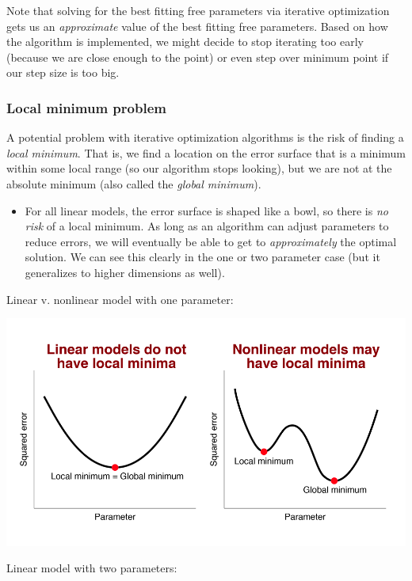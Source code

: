 \documentclass[
  letterpaper,
  DIV=11,
  numbers=noendperiod]{scrartcl}
\providecommand{\tightlist}{%
  \setlength{\itemsep}{0pt}\setlength{\parskip}{0pt}}\usepackage{longtable,booktabs,array}
\begin{document}
Note that solving for the best fitting free parameters via iterative
optimization gets us an \emph{approximate} value of the best fitting
free parameters. Based on how the algorithm is implemented, we might
decide to stop iterating too early (because we are close enough to the
point) or even step over minimum point if our step size is too big.

\subsubsection{Local minimum problem}\label{local-minimum-problem}

A potential problem with iterative optimization algorithms is the risk
of finding a \emph{local minimum}. That is, we find a location on the
error surface that is a minimum within some local range (so our
algorithm stops looking), but we are not at the absolute minimum (also
called the \emph{global minimum}).

\begin{itemize}
\tightlist
\item
  For all linear models, the error surface is shaped like a bowl, so
  there is \emph{no risk} of a local minimum. As long as an algorithm
  can adjust parameters to reduce errors, we will eventually be able to
  get to \emph{approximately} the optimal solution. We can see this
  clearly in the one or two parameter case (but it generalizes to higher
  dimensions as well).
\end{itemize}

Linear v. nonlinear model with one parameter:

\includegraphics{../assests/images/local-v-global-min.png}

Linear model with two parameters:
\end{document}
